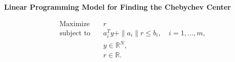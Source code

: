 \documentclass{article}
\begin{document}
\textbf{Linear Programming Model for Finding the Chebychev Center}

\[
\begin{align*}
\text{Maximize} \quad & r \\
\text{subject to} \quad & a_i^T y + \|a_i\| r \leq b_i, \quad i = 1, \ldots, m, \\
& y \in \mathbb{R}^N, \\
& r \in \mathbb{R}.
\end{align*}
\]
\end{document}
